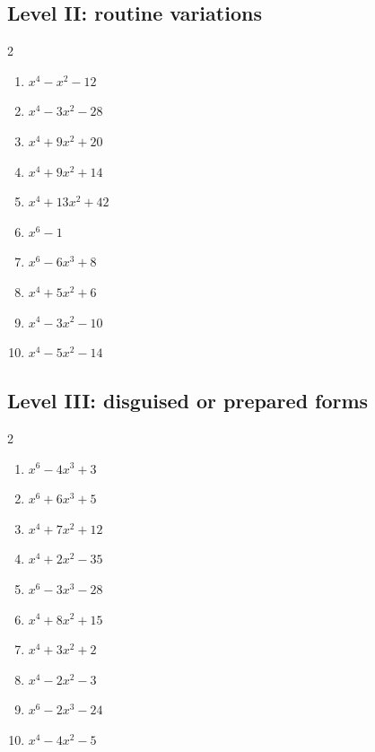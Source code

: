 \documentclass[11pt,oneside]{book}
\begin{document}
\subsection*{Level II: routine variations}
\begin{multicols}{2}
\begin{enumerate}[leftmargin=*,label=\textbf{\arabic*.},itemsep=0.65\baselineskip]
\item $ x^{4} - x^{2} - 12 $
\item $ x^{4} - 3 x^{2} - 28 $
\item $ x^{4} + 9 x^{2} + 20 $
\item $ x^{4} + 9 x^{2} + 14 $
\item $ x^{4} + 13 x^{2} + 42 $
\item $ x^{6} - 1 $
\item $ x^{6} - 6 x^{3} + 8 $
\item $ x^{4} + 5 x^{2} + 6 $
\item $ x^{4} - 3 x^{2} - 10 $
\item $ x^{4} - 5 x^{2} - 14 $
\end{enumerate}
\end{multicols}
\subsection*{Level III: disguised or prepared forms}
\begin{multicols}{2}
\begin{enumerate}[leftmargin=*,label=\textbf{\arabic*.},itemsep=0.65\baselineskip]
\item $ x^{6} - 4 x^{3} + 3 $
\item $ x^{6} + 6 x^{3} + 5 $
\item $ x^{4} + 7 x^{2} + 12 $
\item $ x^{4} + 2 x^{2} - 35 $
\item $ x^{6} - 3 x^{3} - 28 $
\item $ x^{4} + 8 x^{2} + 15 $
\item $ x^{4} + 3 x^{2} + 2 $
\item $ x^{4} - 2 x^{2} - 3 $
\item $ x^{6} - 2 x^{3} - 24 $
\item $ x^{4} - 4 x^{2} - 5 $
\end{enumerate}
\end{multicols}
\end{document}
